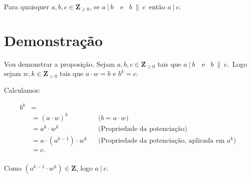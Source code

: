 \documentclass{article}
\def \adivb{{$a\ |\ b$}}
\def \adivc{{$a\ |\ c$}}
\def \bexpc{{$b\ \| \ c$}}
\begin{document}
Para quaisquer $a,b,c \in \mathbf Z _{\ge 0}$, se \adivb \ \ e \ \bexpc \ então \adivc.


\section{Demonstração}

Vou demonstrar a proposição.\newline
Sejam $a,b,c \in \mathbf Z _{\ge 0}$ tais que \adivb \ \ e \ \bexpc.\ Logo sejam $w,k \in \mathbf Z  _{>0}$ tais que $a \cdot w=b$ e $b^k=c$.\newline

Calculamos:\newline



\begin{align*}
b^k& =
&& \text{}\\
& ={(a\cdot w)}^k
&& \text{($b=a\cdot w$)}\\
& = {a^k \cdot w^k}
&& \text{(Propriedade da potenciação)}\\
& = a\cdot {(a^{k-1}) \cdot w^k}
&& \text{(Propriedade da potenciação, aplicada em $a^k$)}\\
& = c.
&& \text{}\\
\end{align*}

Como ${(a^{k-1} \cdot w^k)} \in \mathbf Z$, logo \adivc.  \RectangleBold

\end{document}

